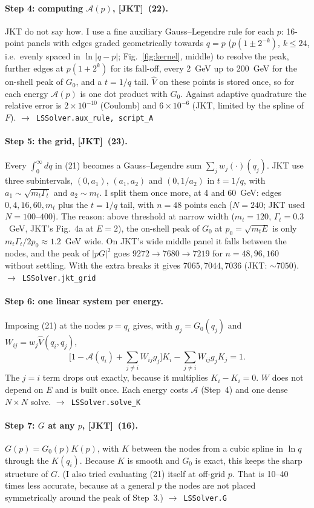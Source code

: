 \documentclass[11pt]{article}
\newcommand{\code}[1]{\texttt{#1}}
\newcommand{\Gt}{\Gamma_t}
\newcommand{\JKT}{[JKT]}
\newcommand{\Vh}{\hat V}
\newcommand{\As}{\mathcal{A}}
\newcommand{\fn}[1]{\hfill$\to$~\code{#1}}
\begin{document}
\paragraph{Step 4: computing $\As(p)$, \JKT\ (22).}
JKT do not say how. I use a fine auxiliary Gauss--Legendre rule for each $p$: 16-point panels with edges graded geometrically towards
$q=p$ ($p(1\pm2^{-k})$, $k\le24$, i.e.\ evenly spaced in $\ln|q-p|$; Fig.~\ref{fig:kernel}, middle) to resolve the peak, further edges at $p(1+2^k)$ for its fall-off, every 2~GeV up to 200~GeV for the
on-shell peak of $G_0$, and a $t=1/q$ tail. $\Vh$ on these points is stored once, so for each energy $\As(p)$ is one dot product with
$G_0$. Against adaptive quadrature the relative error is $2\times10^{-10}$ (Coulomb) and $6\times10^{-6}$ (JKT, limited by the spline
of $F$).
\fn{LSSolver.aux\_rule, script\_A}

\paragraph{Step 5: the grid, \JKT\ (23).}
Every $\int_0^\infty dq$ in (21) becomes a Gauss--Legendre sum $\sum_jw_j(\cdot)(q_j)$. JKT use three subintervals, $(0,a_1)$,
$(a_1,a_2)$ and $(0,1/a_2)$ in $t=1/q$, with $a_1\sim\sqrt{m_t\Gt}$ and $a_2\sim m_t$. I split them once more, at 4 and 60~GeV:
edges $0,4,16,60,m_t$ plus the $t=1/q$ tail, with $n=48$ points each ($N=240$; JKT used $N=100$--$400$). The reason: above
threshold at narrow width ($m_t=120$, $\Gt=0.3$~GeV, JKT's Fig.~4a at $E=2$), the on-shell peak of $G_0$ at $p_0=\sqrt{m_tE}$
is only $m_t\Gt/2p_0\approx1.2$~GeV wide. On JKT's wide middle panel it falls between the nodes, and the peak of $|pG|^2$ goes
$9272\to7680\to7219$ for $n=48,96,160$ without settling. With the extra breaks it gives $7065,7044,7036$ (JKT: $\sim7050$).
\fn{LSSolver.jkt\_grid}

\paragraph{Step 6: one linear system per energy.}
Imposing (21) at the nodes $p=q_i$ gives, with $g_j=G_0(q_j)$ and $W_{ij}=w_j\Vh(q_i,q_j)$,
$$
\Big[1-\As(q_i)+\sum_{j\ne i}W_{ij}g_j\Big]K_i-\sum_{j\ne i}W_{ij}g_jK_j=1 .
$$
The $j=i$ term drops out exactly, because it multiplies $K_i-K_i=0$. $W$ does not depend on $E$ and is built once. Each energy costs
$\As$ (Step~4) and one dense $N\times N$ solve.
\fn{LSSolver.solve\_K}

\paragraph{Step 7: $G$ at any $p$, \JKT\ (16).}
$G(p)=G_0(p)K(p)$, with $K$ between the nodes from a cubic spline in $\ln q$ through the $K(q_i)$. Because $K$ is smooth and $G_0$ is exact,
this keeps the sharp structure of $G$. (I also tried evaluating (21) itself at off-grid $p$. That is 10--40 times less accurate,
because at a general $p$ the nodes are not placed symmetrically around the peak of Step~3.)
\fn{LSSolver.G}
\end{document}
